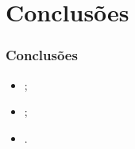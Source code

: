 
\section{Conclusões}

\begin{frame}
  \frametitle{Conclusões}

  \begin{alertblock}{}
    \vspace{5mm}

    \begin{itemize}
      \item \textbf{\alert{}};
      \vspace{5mm}

      \item \textbf{\alert{}};
      \vspace{5mm}

      \item \textbf{\alert{}}.
    \end{itemize}
    \vspace{5mm}

  \end{alertblock}
\end{frame}
